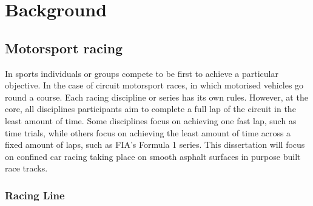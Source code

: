 \section{Background}

\subsection{Motorsport racing}

In sports individuals or groups compete to be first to achieve a particular objective. In the case of circuit motorsport races, in which motorised vehicles go round a course. Each racing discipline or series has its own rules. However, at the core, all disciplines participants aim to complete a full lap of the circuit in the least amount of time. Some disciplines focus on achieving one fast lap, such as time trials, while others focus on achieving the least amount of time across a fixed amount of laps, such as FIA's Formula 1 series. This dissertation will focus on confined car racing taking place on smooth asphalt surfaces in purpose built race tracks. 

\subsubsection{Racing Line}


